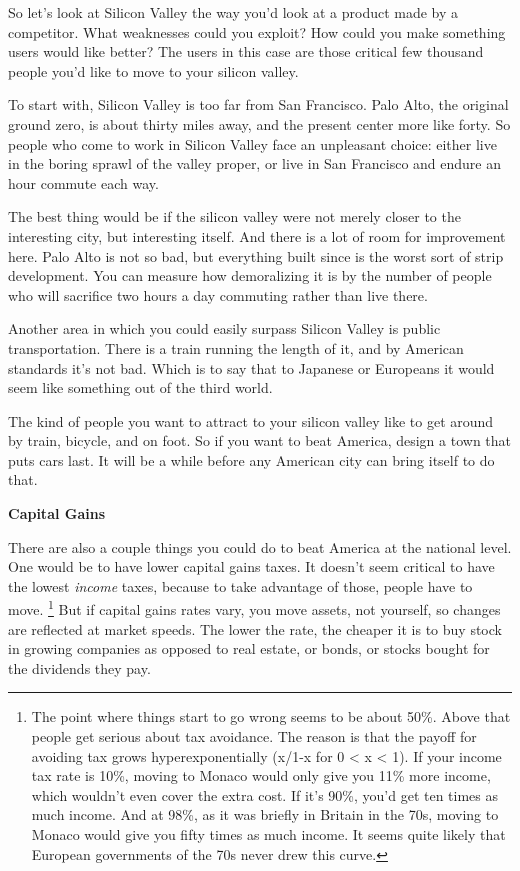 So let's look at Silicon Valley the way you'd look at a product made by
a competitor. What weaknesses could you exploit? How could you make
something users would like better? The users in this case are those
critical few thousand people you'd like to move to your silicon valley.

To start with, Silicon Valley is too far from San Francisco. Palo Alto,
the original ground zero, is about thirty miles away, and the present
center more like forty. So people who come to work in Silicon Valley
face an unpleasant choice: either live in the boring sprawl of the
valley proper, or live in San Francisco and endure an hour commute each
way.

The best thing would be if the silicon valley were not merely closer to
the interesting city, but interesting itself. And there is a lot of room
for improvement here. Palo Alto is not so bad, but everything built
since is the worst sort of strip development. You can measure how
demoralizing it is by the number of people who will sacrifice two hours
a day commuting rather than live there.

Another area in which you could easily surpass Silicon Valley is public
transportation. There is a train running the length of it, and by
American standards it's not bad. Which is to say that to Japanese or
Europeans it would seem like something out of the third world.

The kind of people you want to attract to your silicon valley like to
get around by train, bicycle, and on foot. So if you want to beat
America, design a town that puts cars last. It will be a while before
any American city can bring itself to do that.

\textbf{Capital Gains}

There are also a couple things you could do to beat America at the
national level. One would be to have lower capital gains taxes. It
doesn't seem critical to have the lowest \emph{income} taxes, because to
take advantage of those, people have to move. \footnote{The point where things start to go wrong seems to be about 50\%.
Above that people get serious about tax avoidance. The reason is that
the payoff for avoiding tax grows hyperexponentially (x/1-x for 0
\textless{} x \textless{} 1). If your income tax rate is 10\%, moving to
Monaco would only give you 11\% more income, which wouldn't even cover
the extra cost. If it's 90\%, you'd get ten times as much income. And at
98\%, as it was briefly in Britain in the 70s, moving to Monaco would
give you fifty times as much income. It seems quite likely that European
governments of the 70s never drew this curve.}
But if capital gains rates vary, you move assets, not yourself, so
changes are reflected at market speeds. The lower the rate, the cheaper
it is to buy stock in growing companies as opposed to real estate, or
bonds, or stocks bought for the dividends they pay.

